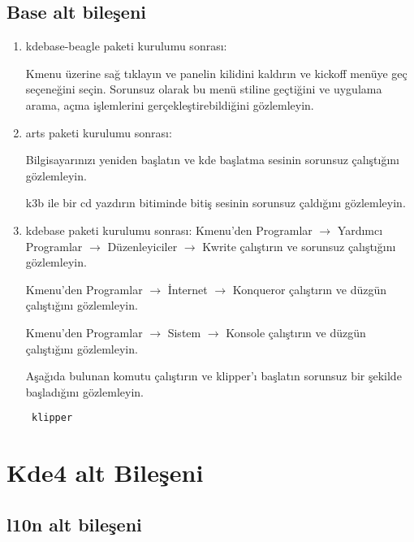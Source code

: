 \documentclass[a4paper,10pt]{article}
\begin{document}
\subsection*{Base alt bileşeni}
\begin{enumerate}
\item kdebase-beagle paketi kurulumu sonrası:

Kmenu üzerine sağ tıklayın ve panelin kilidini kaldırın ve kickoff menüye geç seçeneğini seçin. Sorunsuz olarak bu menü stiline geçtiğini ve uygulama arama, açma işlemlerini gerçekleştirebildiğini gözlemleyin.

\item arts paketi kurulumu sonrası:

Bilgisayarınızı yeniden başlatın ve kde başlatma sesinin sorunsuz çalıştığını gözlemleyin.

k3b ile bir cd yazdırın bitiminde bitiş sesinin sorunsuz çaldığını gözlemleyin.

 \item kdebase paketi kurulumu sonrası:
Kmenu'den Programlar $\rightarrow$ Yardımcı Programlar $\rightarrow$ Düzenleyiciler $\rightarrow$ Kwrite çalıştırın ve sorunsuz çalıştığını gözlemleyin.

Kmenu'den Programlar $\rightarrow$ İnternet $\rightarrow$ Konqueror çalıştırın ve düzgün çalıştığını gözlemleyin.

Kmenu'den Programlar $\rightarrow$ Sistem $\rightarrow$ Konsole çalıştırın ve düzgün çalıştığını gözlemleyin.

Aşağıda bulunan komutu çalıştırın ve klipper'ı başlatın sorunsuz bir şekilde başladığını gözlemleyin.

\begin{verbatim}
 klipper
\end{verbatim}

\end{enumerate}

\section{Kde4 alt Bileşeni}

\subsection*{l10n alt bileşeni}
\end{document}
